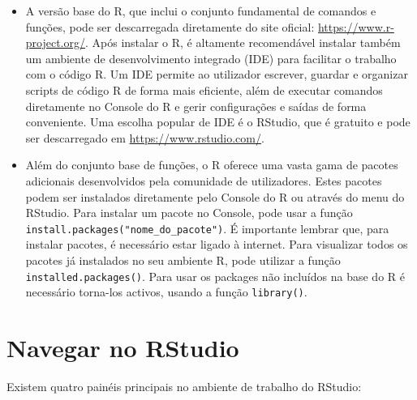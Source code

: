 \documentclass[
]{book}
\begin{document}
\begin{itemize}
\item
  A versão base do R, que inclui o conjunto fundamental de comandos e
  funções, pode ser descarregada diretamente do site oficial:
  \url{https://www.r-project.org/}. Após instalar o R, é altamente
  recomendável instalar também um ambiente de desenvolvimento
  integrado (IDE) para facilitar o trabalho com o código R. Um IDE
  permite ao utilizador escrever, guardar e organizar scripts de
  código R de forma mais eficiente, além de executar comandos
  diretamente no Console do R e gerir configurações e saídas de forma
  conveniente. Uma escolha popular de IDE é o RStudio, que é gratuito
  e pode ser descarregado em \url{https://www.rstudio.com/}.
\item
  Além do conjunto base de funções, o R oferece uma vasta gama de
  pacotes adicionais desenvolvidos pela comunidade de utilizadores.
  Estes pacotes podem ser instalados diretamente pelo Console do R ou
  através do menu do RStudio. Para instalar um pacote no Console, pode
  usar a função \texttt{install.packages("nome\_do\_pacote")}. É importante
  lembrar que, para instalar pacotes, é necessário estar ligado à
  internet. Para visualizar todos os pacotes já instalados no seu
  ambiente R, pode utilizar a função \texttt{installed.packages()}. Para usar
  os packages não incluídos na base do R é necessário torna-los
  activos, usando a função \texttt{library()}.
\end{itemize}

\section{Navegar no RStudio}\label{navegar-no-rstudio}

Existem quatro painéis principais no ambiente de trabalho do RStudio:
\end{document}
